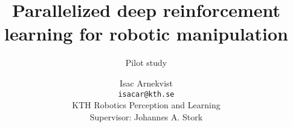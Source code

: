 \documentclass[12pt,a4paper]{scrartcl}
\title{Parallelized deep reinforcement learning for robotic manipulation}
\subtitle{Pilot study}
\author{Isac Arnekvist \\ \texttt{isacar@kth.se} \\ KTH Robotics Perception and Learning \\ Supervisor: Johannes A. Stork}
\begin{document}
\maketitle
\tableofcontents






{}

\end{document}
